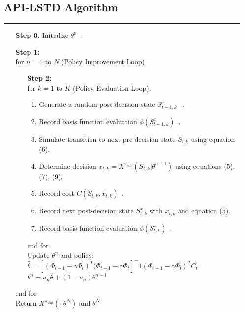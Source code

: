 \documentclass[12pt]{article} %
\begin{document}
\begin{itemize}
    \subsection*{API-LSTD Algorithm}
 	\hrule
    \item[] \begin{center}
        \begin{enumerate}
            \item[\textbf{Step 0:}] Initialize $\theta^0$\ .
            \item[\textbf{Step 1:}]\ \\
                for $n = 1$ to $N$ (Policy Improvement Loop)\\
                \begin{enumerate}
                    \item[\textbf{Step 2:}]\ \\for $k=1$ to $K$ (Policy Evaluation Loop).
                \begin{enumerate}
                    \item Generate a random post-decision state $S_{t-1,k}^x$ \ .
                    \item Record basis function evaluation $\phi(S_{t-1,k}^x)$\ .
                    \item Simulate transition to next pre-decision state $S_{t,k}$ using equation (6).
                    \item Determine decision $x_{t, k} = X^{\pi_{adp}}(S_{t,k} | \theta^{n-1})$ using equations (5), (7), (9).
                    \item Record cost $C(S_{t,k}, x_{t,k})$\ .
                    \item Record next post-decision state $S_{t,k}^x$ with $x_{t,k}$ and equation (5).
                    \item Record basis function evaluation $\phi(S_{t,k}^x)$\ .
                \end{enumerate}
                end for\\
                Update $\theta^n$ and policy:
            \\$\hat{\theta} = [(\Phi_{t-1}-\gamma\Phi_{t})^T(\Phi_{t-1}-\gamma\Phi_{t}]^-1(\Phi_{t-1}-\gamma\Phi_{t})^TC_t$\\$\theta^n=a_n\hat{\theta}+(1-a_n)\theta^{n-1}$
                \end{enumerate}
            end for\\
            Return $X^{\pi_{adp}}(\cdot|\theta^N)$ and $\theta^N$\\

\end{enumerate}
\end{center}
\end{itemize}
\end{document}
